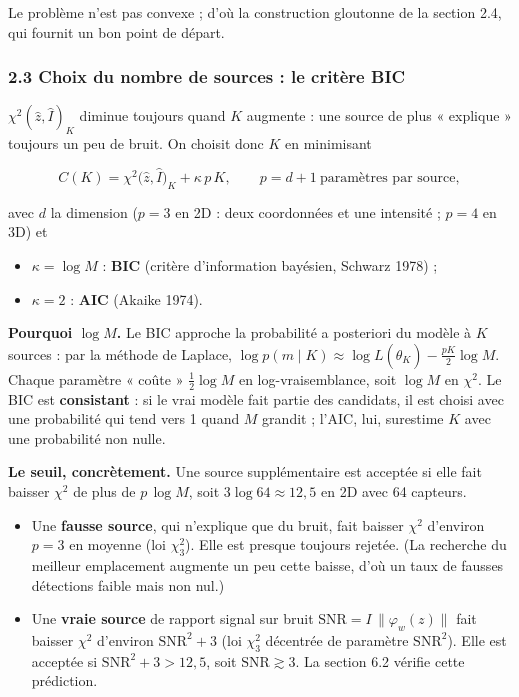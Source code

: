 \documentclass[
  french,
]{article}
\providecommand{\tightlist}{%
  \setlength{\itemsep}{0pt}\setlength{\parskip}{0pt}}
\begin{document}
Le problème n'est pas convexe ; d'où la construction gloutonne de la
section 2.4, qui fournit un bon point de départ.

\subsubsection{2.3 Choix du nombre de sources : le critère
BIC}\label{choix-du-nombre-de-sources-le-crituxe8re-bic}

\(\chi^2(\hat z, \hat I)_K\) diminue toujours quand \(K\) augmente : une
source de plus « explique » toujours un peu de bruit. On choisit donc
\(K\) en minimisant

\[
C(K) = \chi^2\big(\hat z, \hat I\big)_K + \kappa\, p\, K,
\qquad p = d + 1 \ \text{paramètres par source},
\]

avec \(d\) la dimension (\(p = 3\) en 2D : deux coordonnées et une
intensité ; \(p = 4\) en 3D) et

\begin{itemize}
\tightlist
\item
  \(\kappa = \log M\) : \textbf{BIC} (critère d'information bayésien,
  Schwarz 1978) ;
\item
  \(\kappa = 2\) : \textbf{AIC} (Akaike 1974).
\end{itemize}

\textbf{Pourquoi \(\log M\).} Le BIC approche la probabilité a
posteriori du modèle à \(K\) sources : par la méthode de Laplace,
\(\log p(m\mid K)\approx \log L(\hat\theta_K) - \tfrac{pK}{2}\log M\).
Chaque paramètre « coûte » \(\tfrac12\log M\) en log-vraisemblance, soit
\(\log M\) en \(\chi^2\). Le BIC est \textbf{consistant} : si le vrai
modèle fait partie des candidats, il est choisi avec une probabilité qui
tend vers 1 quand \(M\) grandit ; l'AIC, lui, surestime \(K\) avec une
probabilité non nulle.

\textbf{Le seuil, concrètement.} Une source supplémentaire est acceptée
si elle fait baisser \(\chi^2\) de plus de \(p\,\log M\), soit
\(3\log 64\approx 12{,}5\) en 2D avec 64 capteurs.

\begin{itemize}
\tightlist
\item
  Une \textbf{fausse source}, qui n'explique que du bruit, fait baisser
  \(\chi^2\) d'environ \(p = 3\) en moyenne (loi \(\chi^2_3\)). Elle est
  presque toujours rejetée. (La recherche du meilleur emplacement
  augmente un peu cette baisse, d'où un taux de fausses détections
  faible mais non nul.)
\item
  Une \textbf{vraie source} de rapport signal sur bruit
  \(\mathrm{SNR} = I\,\lVert\varphi_w(z)\rVert\) fait baisser \(\chi^2\)
  d'environ \(\mathrm{SNR}^2 + 3\) (loi \(\chi^2_3\) décentrée de
  paramètre \(\mathrm{SNR}^2\)). Elle est acceptée si
  \(\mathrm{SNR}^2 + 3 > 12{,}5\), soit \(\mathrm{SNR}\gtrsim 3\). La
  section 6.2 vérifie cette prédiction.
\end{itemize}
\end{document}
